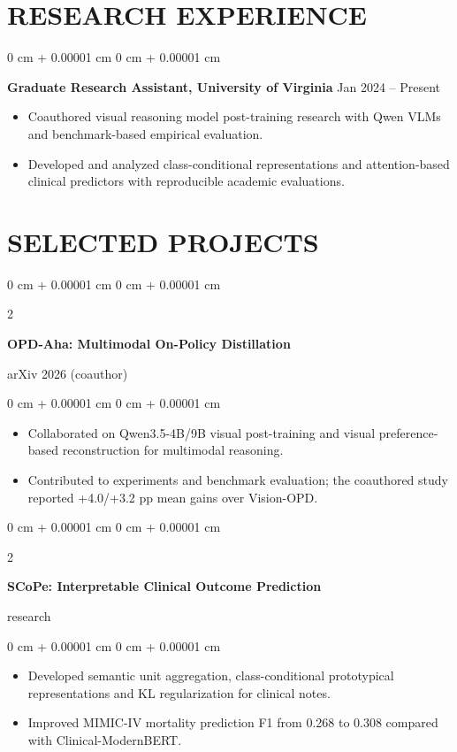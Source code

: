 \documentclass[10pt, letterpaper]{article}
\newenvironment{highlights}{
    \begin{itemize}[
        topsep=0.10 cm,
        parsep=0.10 cm,
        partopsep=0pt,
        itemsep=0pt,
        leftmargin=0 cm + 10pt
    ]
}{
    \end{itemize}
} %
\newenvironment{onecolentry}{
    \begin{adjustwidth}{
        0 cm + 0.00001 cm
    }{
        0 cm + 0.00001 cm
    }
}{
    \end{adjustwidth}
} %
\newenvironment{twocolentry}[2][]{
    \onecolentry
    \def\secondColumn{#2}
    \setcolumnwidth{\fill, 4.5 cm}
    \begin{paracol}{2}
}{
    \switchcolumn \raggedleft \secondColumn
    \end{paracol}
    \endonecolentry
} %
\begin{document}
\section{RESEARCH EXPERIENCE}
\begin{onecolentry}
\textbf{Graduate Research Assistant, University of Virginia} \hfill Jan 2024 -- Present
\begin{highlights}
\item Coauthored visual reasoning model post-training research with Qwen VLMs and benchmark-based empirical evaluation.
\item Developed and analyzed class-conditional representations and attention-based clinical predictors with reproducible academic evaluations.
\end{highlights}
\end{onecolentry}
\section{SELECTED PROJECTS}
\begin{twocolentry}{arXiv 2026 (coauthor)}
\textbf{OPD-Aha: Multimodal On-Policy Distillation}
\end{twocolentry}
\begin{onecolentry}
\begin{highlights}
\item Collaborated on Qwen3.5-4B/9B visual post-training and visual preference-based reconstruction for multimodal reasoning.
\item Contributed to experiments and benchmark evaluation; the coauthored study reported +4.0/+3.2 pp mean gains over Vision-OPD.
\end{highlights}
\end{onecolentry}
\vspace{0.03 cm}
\begin{twocolentry}{2026 research}
\textbf{SCoPe: Interpretable Clinical Outcome Prediction}
\end{twocolentry}
\begin{onecolentry}
\begin{highlights}
\item Developed semantic unit aggregation, class-conditional prototypical representations and KL regularization for clinical notes.
\item Improved MIMIC-IV mortality prediction F1 from 0.268 to 0.308 compared with Clinical-ModernBERT.
\end{highlights}
\end{onecolentry}
\end{document}
